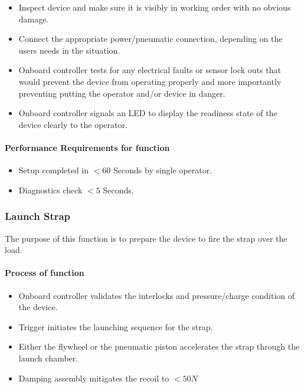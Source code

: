 \documentclass[a4paper,10pt]{article} %
\begin{document}
\begin{itemize}
    \item Inspect device and make sure it is visibly in working order with no obvious damage.
    \item Connect the appropriate power/pneumatic connection, depending on the users needs in the situation.
    \item Onboard controller tests for any electrical faults or sensor lock outs that would prevent the device from operating properly and more importantly preventing putting the operator and/or device in danger.
    \item Onboard controller signals an LED to display the readiness state of the device clearly to the operator.
\end{itemize}

\paragraph{Performance Requirements for function}

\begin{itemize}
    \item Setup completed in $<60$ Seconds by single operator.
    \item Diagnostics check $<5$ Seconds. 
\end{itemize}


\subsubsection{Launch Strap}

The purpose of this function is to prepare the device to fire the strap over the load. 

\paragraph{Process of function}


\begin{itemize}
    \item Onboard controller validates the interlocks and pressure/charge condition of the device.
    \item Trigger initiates the launching sequence for the strap.
    \item Either the flywheel or the pneumatic piston accelerates the strap through the launch chamber.
    \item Damping assembly mitigates the recoil to $< 50N$
\end{itemize}
\end{document}
